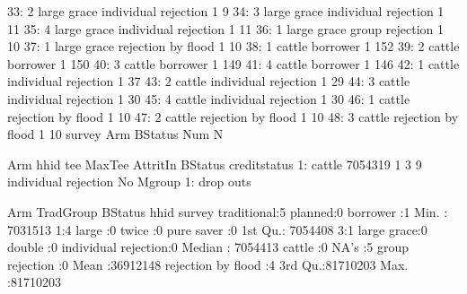 \begin{Schunk}
\begin{Soutput}
33:      2 large grace individual rejection   1   9
34:      3 large grace individual rejection   1  11
35:      4 large grace individual rejection   1  11
36:      1 large grace      group rejection   1  10
37:      1 large grace   rejection by flood   1  10
38:      1      cattle             borrower   1 152
39:      2      cattle             borrower   1 150
40:      3      cattle             borrower   1 149
41:      4      cattle             borrower   1 146
42:      1      cattle individual rejection   1  37
43:      2      cattle individual rejection   1  29
44:      3      cattle individual rejection   1  30
45:      4      cattle individual rejection   1  30
46:      1      cattle   rejection by flood   1  10
47:      2      cattle   rejection by flood   1  10
48:      3      cattle   rejection by flood   1  10
    survey         Arm              BStatus Num   N
\end{Soutput}
\begin{Soutput}
      Arm    hhid tee MaxTee AttritIn              BStatus creditstatus
1: cattle 7054319   1      3        9 individual rejection           No
      Mgroup
1: drop outs
\end{Soutput}
\begin{Soutput}
          Arm      TradGroup                 BStatus       hhid          survey
 traditional:5   planned:0   borrower            :1   Min.   : 7031513   1:4   
 large      :0   twice  :0   pure saver          :0   1st Qu.: 7054408   3:1   
 large grace:0   double :0   individual rejection:0   Median : 7054413         
 cattle     :0   NA's   :5   group rejection     :0   Mean   :36912148         
                             rejection by flood  :4   3rd Qu.:81710203         
                                                      Max.   :81710203         
                                                                               

\end{Soutput}
\end{Schunk}
